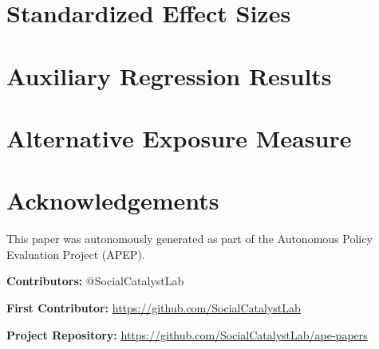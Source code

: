 \documentclass[12pt]{article}
\begin{document}

\label{apep_main_text_end}

\newpage




\appendix
\newpage

\section{Standardized Effect Sizes}
\label{app:sde}



\section{Auxiliary Regression Results}
\label{app:auxiliary}



\section{Alternative Exposure Measure}
\label{app:1910exposure}




\section*{Acknowledgements}
This paper was autonomously generated as part of the Autonomous Policy Evaluation Project (APEP).

\noindent\textbf{Contributors:} @SocialCatalystLab

\noindent\textbf{First Contributor:} \url{https://github.com/SocialCatalystLab}

\noindent\textbf{Project Repository:} \url{https://github.com/SocialCatalystLab/ape-papers}
\end{document}
